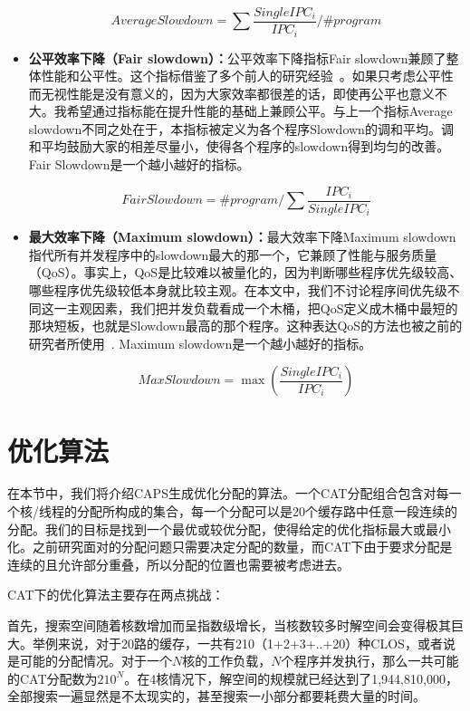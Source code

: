 \begin{itemize}
\begin{equation}
	AverageSlowdown = \sum\frac{SingleIPC_i}{IPC_i} / \#program
\end{equation}

\item \textbf{公平效率下降（Fair slowdown）：}公平效率下降指标Fair slowdown兼顾了整体性能和公平性。这个指标借鉴了多个前人的研究经验~\parencite{luo2001balancing, chang2014cooperative}。如果只考虑公平性而无视性能是没有意义的，因为大家效率都很差的话，即使再公平也意义不大。我希望通过指标能在提升性能的基础上兼顾公平。与上一个指标Average slowdown不同之处在于，本指标被定义为各个程序Slowdown的调和平均。调和平均鼓励大家的相差尽量小，使得各个程序的slowdown得到均匀的改善。Fair Slowdown是一个越小越好的指标。

\begin{equation}
	FairSlowdown = \#program / {\sum\frac{IPC_i}{SingleIPC_i}}
\end{equation}

\item \textbf{最大效率下降（Maximum slowdown）：}最大效率下降Maximum slowdown指代所有并发程序中的slowdown最大的那一个，它兼顾了性能与服务质量（QoS）。事实上，QoS是比较难以被量化的，因为判断哪些程序优先级较高、哪些程序优先级较低本身就比较主观。在本文中，我们不讨论程序间优先级不同这一主观因素，我们把并发负载看成一个木桶，把QoS定义成木桶中最短的那块短板，也就是Slowdown最高的那个程序。这种表达QoS的方法也被之前的研究者所使用~\parencite{manikantan2012probabilistic}. Maximum slowdown是一个越小越好的指标。

\begin{equation}
MaxSlowdown=\max(\frac{SingleIPC_i}{IPC_i})
\label{eq:qos}
\end{equation}

\end{itemize}

\section{优化算法}

在本节中，我们将介绍CAPS生成优化分配的算法。一个CAT分配组合包含对每一个核/线程的分配所构成的集合，每一个分配可以是20个缓存路中任意一段连续的分配。我们的目标是找到一个最优或较优分配，使得给定的优化指标最大或最小化。之前研究面对的分配问题只需要决定分配的数量，而CAT下由于要求分配是连续的且允许部分重叠，所以分配的位置也需要被考虑进去。

CAT下的优化算法主要存在两点挑战：

首先，搜索空间随着核数增加而呈指数级增长，当核数较多时解空间会变得极其巨大。举例来说，对于20路的缓存，一共有210（1+2+3+..+20）种CLOS，或者说是可能的分配情况。对于一个$N$核的工作负载，$N$个程序并发执行，那么一共可能的CAT分配数为$210^N$。在4核情况下，解空间的规模就已经达到了1,944,810,000，全部搜索一遍显然是不太现实的，甚至搜索一小部分都要耗费大量的时间。

